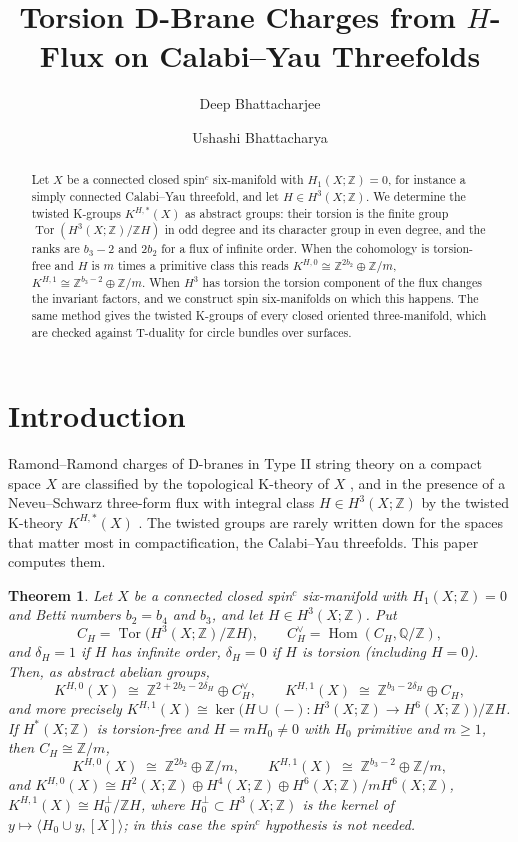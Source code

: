 \documentclass[reqno,11pt]{amsart}
\title[Torsion D-brane charges from $H$-flux]{Torsion D-Brane Charges from $H$-Flux on Calabi--Yau Threefolds}
\author[D.~Bhattacharjee]{Deep Bhattacharjee}
\author[U.~Bhattacharya]{Ushashi Bhattacharya}
\newtheorem{theorem}{Theorem}[section]
\theoremstyle{definition}
\newcommand{\ZZ}{\mathbb{Z}}
\newcommand{\QQ}{\mathbb{Q}}
\DeclareMathOperator{\Tor}{Tor}
\DeclareMathOperator{\Hom}{Hom}
\begin{document}
\begin{abstract}
Let $X$ be a connected closed spin$^c$ six-manifold with $H_1(X;\ZZ)=0$, for instance a simply connected Calabi--Yau threefold, and let $H\in H^3(X;\ZZ)$. We determine the twisted K-groups $K^{H,*}(X)$ as abstract groups: their torsion is the finite group $\Tor(H^3(X;\ZZ)/\ZZ H)$ in odd degree and its character group in even degree, and the ranks are $b_3-2$ and $2b_2$ for a flux of infinite order. When the cohomology is torsion-free and $H$ is $m$ times a primitive class this reads $K^{H,0}\cong\ZZ^{2b_2}\oplus\ZZ/m$, $K^{H,1}\cong\ZZ^{b_3-2}\oplus\ZZ/m$. When $H^3$ has torsion the torsion component of the flux changes the invariant factors, and we construct spin six-manifolds on which this happens. The same method gives the twisted K-groups of every closed oriented three-manifold, which are checked against T-duality for circle bundles over surfaces.
\end{abstract}

\maketitle

\section{Introduction}\label{sec:intro}

Ramond--Ramond charges of D-branes in Type II string theory on a compact space $X$ are classified by the topological K-theory of $X$ \cite{MM97,Wit98}, and in the presence of a Neveu--Schwarz three-form flux with integral class $H\in H^3(X;\ZZ)$ by the twisted K-theory $K^{H,*}(X)$ \cite{Wit98,BM00,Kap00}. The twisted groups are rarely written down for the spaces that matter most in compactification, the Calabi--Yau threefolds. This paper computes them.

\begin{theorem}\label{thm:six}
Let $X$ be a connected closed spin$^c$ six-manifold with $H_1(X;\ZZ)=0$ and Betti numbers $b_2=b_4$ and $b_3$, and let $H\in H^3(X;\ZZ)$. Put
\[
C_H=\Tor\bigl(H^3(X;\ZZ)/\ZZ H\bigr),\qquad C_H^\vee=\Hom(C_H,\QQ/\ZZ),
\]
and $\delta_H=1$ if $H$ has infinite order, $\delta_H=0$ if $H$ is torsion (including $H=0$).
Then, as abstract abelian groups,
\[
K^{H,0}(X)\;\cong\;\ZZ^{2+2b_2-2\delta_H}\oplus C_H^\vee,\qquad
K^{H,1}(X)\;\cong\;\ZZ^{b_3-2\delta_H}\oplus C_H ,
\]
and more precisely $K^{H,1}(X)\cong\ker\bigl(H\cup(-)\colon H^3(X;\ZZ)\to H^6(X;\ZZ)\bigr)/\ZZ H$. If $H^*(X;\ZZ)$ is torsion-free and $H=mH_0\neq0$ with $H_0$ primitive and $m\ge1$, then $C_H\cong\ZZ/m$,
\[
K^{H,0}(X)\;\cong\;\ZZ^{2b_2}\oplus\ZZ/m,\qquad
K^{H,1}(X)\;\cong\;\ZZ^{b_3-2}\oplus\ZZ/m ,
\]
and $K^{H,0}(X)\cong H^2(X;\ZZ)\oplus H^4(X;\ZZ)\oplus H^6(X;\ZZ)/mH^6(X;\ZZ)$, $K^{H,1}(X)\cong H_0^{\perp}/\ZZ H$, where $H_0^\perp\subset H^3(X;\ZZ)$ is the kernel of $y\mapsto\langle H_0\cup y,[X]\rangle$; in this case the spin$^c$ hypothesis is not needed.
\end{theorem}
\end{document}
